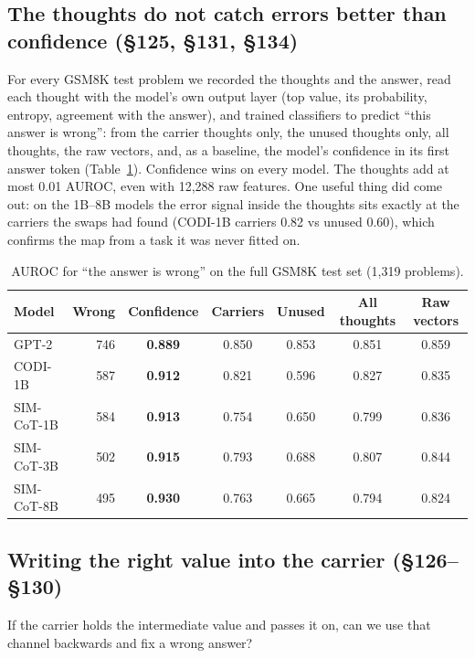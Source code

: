 \documentclass{article}
\begin{document}
\subsection{The thoughts do not catch errors better than confidence (\S125, \S131, \S134)}
For every GSM8K test problem we recorded the thoughts and the answer, read each thought with the model's own output layer (top value, its probability, entropy, agreement with the answer), and trained classifiers to predict ``this answer is wrong'': from the carrier thoughts only, the unused thoughts only, all thoughts, the raw vectors, and, as a baseline, the model's confidence in its first answer token (Table~\ref{tab:errdet}). Confidence wins on every model. The thoughts add at most 0.01 AUROC, even with 12,288 raw features. One useful thing did come out: on the 1B--8B models the error signal inside the thoughts sits exactly at the carriers the swaps had found (CODI-1B carriers 0.82 vs unused 0.60), which confirms the map from a task it was never fitted on.

\begin{table}[h]
\caption{AUROC for ``the answer is wrong'' on the full GSM8K test set (1,319 problems).}
\label{tab:errdet}
\centering\footnotesize
\setlength{\tabcolsep}{5pt}
\begin{tabular}{lrccccc}
\toprule
Model & Wrong & Confidence & Carriers & Unused & All thoughts & Raw vectors \\
\midrule
GPT-2 & 746 & \textbf{0.889} & 0.850 & 0.853 & 0.851 & 0.859 \\
CODI-1B & 587 & \textbf{0.912} & 0.821 & 0.596 & 0.827 & 0.835 \\
SIM-CoT-1B & 584 & \textbf{0.913} & 0.754 & 0.650 & 0.799 & 0.836 \\
SIM-CoT-3B & 502 & \textbf{0.915} & 0.793 & 0.688 & 0.807 & 0.844 \\
SIM-CoT-8B & 495 & \textbf{0.930} & 0.763 & 0.665 & 0.794 & 0.824 \\
\bottomrule
\end{tabular}
\end{table}

\subsection{Writing the right value into the carrier (\S126--\S130)}

If the carrier holds the intermediate value and passes it on, can we use that channel backwards and fix a wrong answer?
\end{document}
